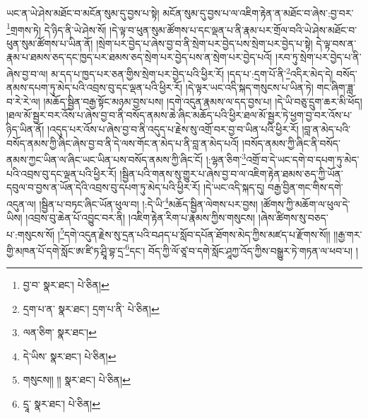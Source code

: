 ཡང་ན་ཡེ་ཤེས་མཐོང་བ་མངོན་སུམ་དུ་བྱས་པ་སྟེ། མངོན་སུམ་དུ་བྱས་པ་ལ་འཇིག་རྟེན་ན་མཐོང་བ་ཞེས་:བྱ་བར་\footnote{བྱ་བ་  སྣར་ཐང་།  པེ་ཅིན། }གྲགས་ཏེ། དེ་ཉིད་ནི་ཡེ་ཤེས་སོ། །དེ་ལྟ་བ་ཕུན་སུམ་ཚོགས་པ་དང་ལྡན་པ་ནི་རྣམ་པར་གྲོལ་བའི་ཡེ་ཤེས་མཐོང་བ་ཕུན་སུམ་ཚོགས་པ་ཡིན་ནོ། །སྲེག་པར་བྱེད་པ་ཞེས་བྱ་བ་ནི་སྲེག་པར་བྱེད་པས་སྲེག་པར་བྱེད་པ་སྟེ། དེ་ལྟ་བས་ན་རྣམ་པ་ཐམས་ཅད་དང་ཁྱད་པར་ཐམས་ཅད་སྲེག་པར་བྱེད་པས་ན་སྲེག་པར་བྱེད་པའོ། །རབ་ཏུ་སྲེག་པར་བྱེད་པ་ནི་ཞེས་བྱ་བ་ལ། མ་དད་པ་ཁྱད་པར་ཅན་གྱིས་སྲེག་པར་བྱེད་པའི་ཕྱིར་རོ། །དད་པ་:དྲག་པོ་ནི་\footnote{དྲག་པ་ན་  སྣར་ཐང་། དྲག་པ་ནི་  པེ་ཅིན། }འདིར་མེད་དེ། བསོད་ནམས་དཔག་ཏུ་མེད་པའི་འབྲས་བུ་དང་ལྡན་པའི་ཕྱིར་རོ། །དེ་ལྟར་ཡང་འདི་སྐད་གསུངས་པ་ཡིན་ཏེ། གང་ཞིག་ཟླ་བ་རེ་རེ་ལ། །མཆོད་སྦྱིན་བརྒྱ་སྟོང་མཉམ་བྱས་པས། །དགེ་འདུན་རྣམས་ལ་དད་བྱས་པ། །དེ་ཡི་བཅུ་དྲུག་ཆར་མི་ཕོད། །ཐལ་མོ་སྦྱར་བར་འོས་པ་ཞེས་བྱ་བ་ནི་བསོད་ནམས་ཆེ་ཞིང་མཆོད་པའི་ཕྱིར་ཐལ་མོ་སྦྱར་ཏེ་ཕྱག་བྱ་བར་འོས་པ་ཉིད་ཡིན་ནོ། །འདུད་པར་འོས་པ་ཞེས་བྱ་བ་ནི་འདུད་པ་རྗེས་སུ་འགྲོ་བར་བྱ་བ་ཡིན་པའི་ཕྱིར་རོ། །བླ་ན་མེད་པའི་བསོད་ནམས་ཀྱི་ཞིང་ཞེས་བྱ་བ་ནི་དེ་ལས་གོང་ན་མེད་པ་ནི་བླ་ན་མེད་པའོ། །བསོད་ནམས་ཀྱི་ཞིང་ནི་བསོད་ནམས་ཀྱང་ཡིན་ལ་ཞིང་ཡང་ཡིན་པས་བསོད་ནམས་ཀྱི་ཞིང་ངོ། །:ལྷན་ཅིག་\footnote{ལན་ཅིག་  སྣར་ཐང་། }འགྲོ་བ་དེ་ཡང་དགེ་བ་དཔག་ཏུ་མེད་པའི་འབྲས་བུ་དང་ལྡན་པའི་ཕྱིར་རོ། །སྦྱིན་པའི་གནས་སུ་གྱུར་པ་ཞེས་བྱ་བ་ལ་འཇིག་རྟེན་ཐམས་ཅད་ཀྱི་ཡོན་དབུལ་བ་བྱས་ན་ཡོན་དེའི་འབྲས་བུ་དཔག་ཏུ་མེད་པའི་ཕྱིར་རོ། །དེ་ཡང་འདི་སྐད་དུ། བརྒྱ་བྱིན་གང་གིས་དགེ་འདུན་ལ། །སྦྱིན་པ་བཏང་ཞིང་ཡོན་ཕུལ་བ། །:དེ་ཡི་\footnote{དེ་ཡིས་  སྣར་ཐང་།  པེ་ཅིན། }མཆོད་སྦྱིན་ལེགས་པར་བྱས། །ཚོགས་ཀྱི་མཆོག་ལ་ཕུལ་དེ་ཡིས། །འབྲས་བུ་ཆེན་པོ་འབྱུང་བར་ནི། །འཇིག་རྟེན་རིག་པ་རྣམས་ཀྱིས་གསུངས། །ཞེས་ཚིགས་སུ་བཅད་པ་:གསུངས་སོ། །\footnote{གསུངས།། །།  སྣར་ཐང་།  པེ་ཅིན། }དགེ་འདུན་རྗེས་སུ་དྲན་པའི་བཤད་པ་སློབ་དཔོན་ཐོགས་མེད་ཀྱིས་མཛད་པ་རྫོགས་སོ།། །།རྒྱ་གར་གྱི་མཁན་པོ་དགེ་སློང་ཨ་ཛི་ཏ་ཤྲཱི་བྷ་དྲ་\footnote{དྲཱ་  སྣར་ཐང་།  པེ་ཅིན། }དང་། བོད་ཀྱི་ལོ་ཙཱ་བ་དགེ་སློང་ཤཱཀྱ་འོད་ཀྱིས་བསྒྱུར་ཏེ་གཏན་ལ་ཕབ་པ། ། 